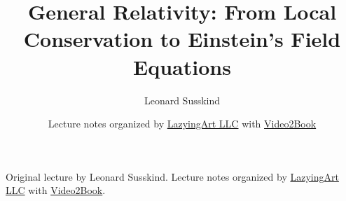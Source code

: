 \documentclass[11pt,oneside]{book}
\begin{document}
\frontmatter
\hypersetup{pageanchor=false}
\title{General Relativity: From Local Conservation to Einstein's Field Equations}
\author{Leonard Susskind}
\date{Lecture notes organized by \href{https://lazying.art}{LazyingArt LLC} with \href{https://github.com/lachlanchen/Video2Book}{Video2Book}}
\maketitle
\begin{center}
\small Original lecture by Leonard Susskind. Lecture notes organized by \href{https://lazying.art}{LazyingArt LLC} with \href{https://github.com/lachlanchen/Video2Book}{Video2Book}.
\end{center}
\clearpage
\hypersetup{pageanchor=true}
\mainmatter

\end{document}
